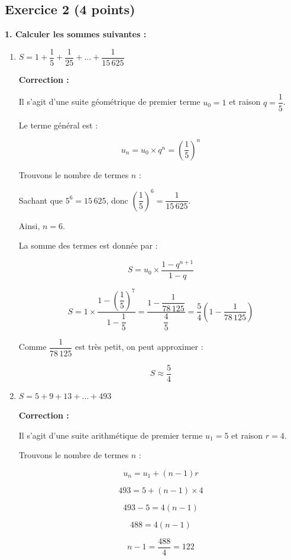 \documentclass{article}
\begin{document}
\bigskip

\subsection*{Exercice 2 (4 points)}

\textbf{1. Calculer les sommes suivantes :}

\begin{enumerate}[label=\alph*)]

\item \( S = 1 + \dfrac{1}{5} + \dfrac{1}{25} + \dots + \dfrac{1}{15\,625} \)

\textbf{Correction :}

Il s'agit d'une suite géométrique de premier terme \( u_0 = 1 \) et raison \( q = \dfrac{1}{5} \).

Le terme général est :

\[ u_n = u_0 \times q^n = \left( \dfrac{1}{5} \right)^n \]

Trouvons le nombre de termes \( n \) :

Sachant que \( 5^6 = 15\,625 \), donc \( \left( \dfrac{1}{5} \right)^6 = \dfrac{1}{15\,625} \).

Ainsi, \( n = 6 \).

La somme des termes est donnée par :

\[ S = u_0 \times \dfrac{1 - q^{n+1}}{1 - q} \]

\[ S = 1 \times \dfrac{1 - \left( \dfrac{1}{5} \right)^{7}}{1 - \dfrac{1}{5}} = \dfrac{1 - \dfrac{1}{78\,125}}{\dfrac{4}{5}} = \dfrac{5}{4} \left( 1 - \dfrac{1}{78\,125} \right) \]

Comme \( \dfrac{1}{78\,125} \) est très petit, on peut approximer :

\[ S \approx \dfrac{5}{4} \]

\bigskip

\item \( S = 5 + 9 + 13 + \dots + 493 \)

\textbf{Correction :}

Il s'agit d'une suite arithmétique de premier terme \( u_1 = 5 \) et raison \( r = 4 \).

Trouvons le nombre de termes \( n \) :

\[ u_n = u_1 + (n - 1) r \]

\[ 493 = 5 + (n - 1) \times 4 \]

\[ 493 - 5 = 4(n - 1) \]

\[ 488 = 4(n - 1) \]

\[ n - 1 = \dfrac{488}{4} = 122 \]


\end{enumerate}
\end{document}
